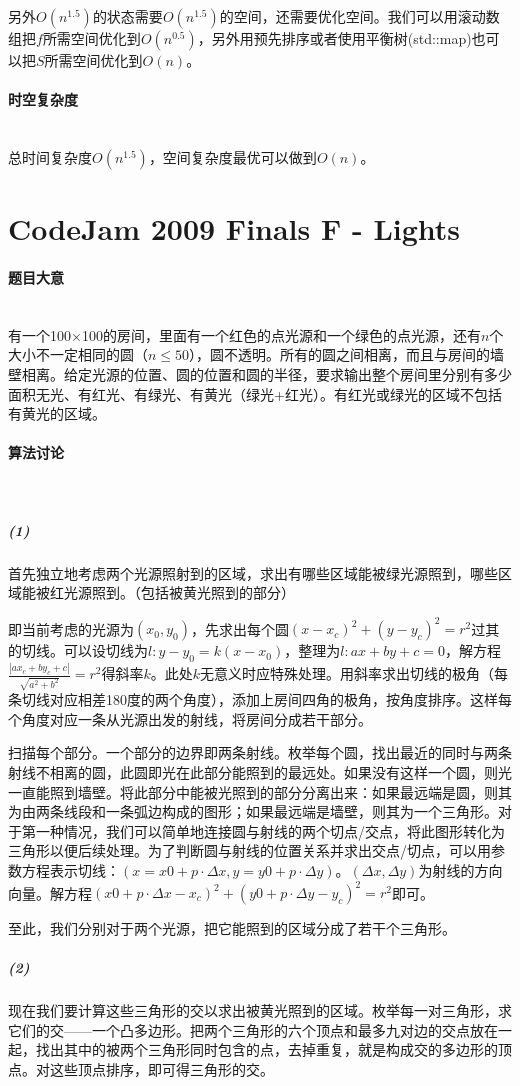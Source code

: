 \documentclass[UTF8]{ctexart}
\newcommand{\myparagraph}[1]{\paragraph{#1}\mbox{}\\}
\theoremstyle{nonumberplain}
\begin{document}
			另外$O(n^{1.5})$的状态需要$O(n^{1.5})$的空间，还需要优化空间。我们可以用滚动数组把$f$所需空间优化到$O(n^{0.5})$，另外用预先排序或者使用平衡树(std::map)也可以把$S$所需空间优化到$O(n)$。
		
		\myparagraph{时空复杂度}
		
			总时间复杂度$O(n^{1.5})$，空间复杂度最优可以做到$O(n)$。
	
	\section{CodeJam 2009 Finals F - Lights}
	
		\myparagraph{题目大意}
		
			有一个100×100的房间，里面有一个红色的点光源和一个绿色的点光源，还有$n$个大小不一定相同的圆（$n \leq 50$），圆不透明。所有的圆之间相离，而且与房间的墙壁相离。给定光源的位置、圆的位置和圆的半径，要求输出整个房间里分别有多少面积无光、有红光、有绿光、有黄光（绿光+红光）。有红光或绿光的区域不包括有黄光的区域。
		
		\myparagraph{算法讨论}
		
			\subparagraph{(1)}
			首先独立地考虑两个光源照射到的区域，求出有哪些区域能被绿光源照到，哪些区域能被红光源照到。（包括被黄光照到的部分）
			
			即当前考虑的光源为$(x_0,y_0)$，先求出每个圆$(x-x_c)^2+(y-y_c)^2=r^2$过其的切线。可以设切线为$l:y-y_0=k(x-x_0)$，整理为$l:ax+by+c=0$，解方程$\frac{|ax_c+by_c+c|}{\sqrt{a^2+b^2}}=r^2$得斜率$k$。此处$k$无意义时应特殊处理。用斜率求出切线的极角（每条切线对应相差180度的两个角度），添加上房间四角的极角，按角度排序。这样每个角度对应一条从光源出发的射线，将房间分成若干部分。
			
			扫描每个部分。一个部分的边界即两条射线。枚举每个圆，找出最近的同时与两条射线不相离的圆，此圆即光在此部分能照到的最远处。如果没有这样一个圆，则光一直能照到墙壁。将此部分中能被光照到的部分分离出来：如果最远端是圆，则其为由两条线段和一条弧边构成的图形；如果最远端是墙壁，则其为一个三角形。对于第一种情况，我们可以简单地连接圆与射线的两个切点/交点，将此图形转化为三角形以便后续处理。为了判断圆与射线的位置关系并求出交点/切点，可以用参数方程表示切线：$(x=x0+p \cdot \Delta x, y=y0+p \cdot \Delta y)$。$(\Delta x, \Delta y)$为射线的方向向量。解方程$(x0+p \cdot \Delta x-x_c)^2+(y0+p \cdot \Delta y-y_c)^2=r^2$即可。
			
			至此，我们分别对于两个光源，把它能照到的区域分成了若干个三角形。
			
			\subparagraph{(2)}
			现在我们要计算这些三角形的交以求出被黄光照到的区域。枚举每一对三角形，求它们的交——一个凸多边形。把两个三角形的六个顶点和最多九对边的交点放在一起，找出其中的被两个三角形同时包含的点，去掉重复，就是构成交的多边形的顶点。对这些顶点排序，即可得三角形的交。
			
\end{document}
